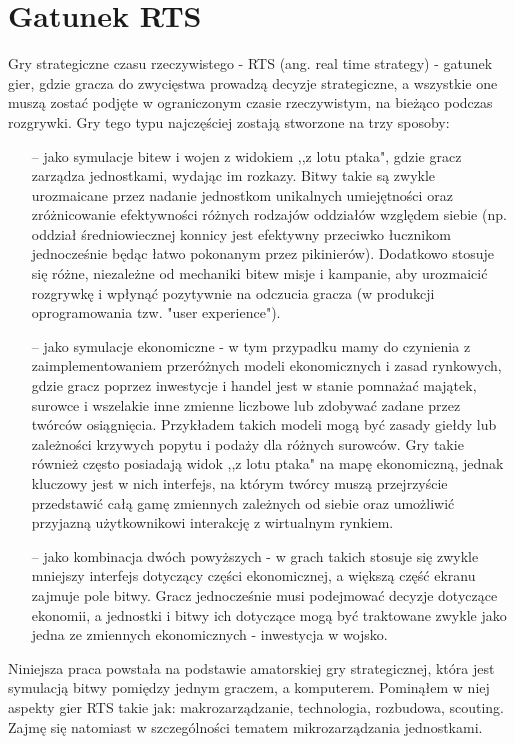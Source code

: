 \documentclass[12pt]{report}
\begin{document}
\section {Gatunek RTS}
Gry strategiczne czasu rzeczywistego - RTS (ang. real time strategy) - gatunek gier, gdzie gracza do zwycięstwa prowadzą decyzje strategiczne, a wszystkie one muszą zostać podjęte w ograniczonym czasie rzeczywistym, na bieżąco podczas rozgrywki. Gry tego typu najczęściej zostają stworzone na trzy sposoby: 
\begin{itemize}
\item[--] jako symulacje bitew i wojen z widokiem ,,z lotu ptaka", gdzie gracz zarządza jednostkami, wydając im rozkazy. Bitwy takie są zwykle urozmaicane przez nadanie jednostkom unikalnych umiejętności oraz zróżnicowanie efektywności różnych rodzajów oddziałów względem siebie (np. oddział średniowiecznej konnicy jest efektywny przeciwko łucznikom jednocześnie będąc łatwo pokonanym przez pikinierów). Dodatkowo stosuje się różne, niezależne od mechaniki bitew misje i kampanie, aby urozmaicić rozgrywkę i wpłynąć pozytywnie na odczucia gracza (w produkcji oprogramowania tzw. "user experience").
\item[--] jako symulacje ekonomiczne - w tym przypadku mamy do czynienia z zaimplementowaniem przeróżnych modeli ekonomicznych i zasad rynkowych, gdzie gracz poprzez inwestycje i handel jest w stanie pomnażać majątek, surowce i wszelakie inne zmienne liczbowe lub zdobywać zadane przez twórców osiągnięcia. Przykładem takich modeli mogą być zasady giełdy lub zależności krzywych popytu i podaży dla różnych surowców. Gry takie również często posiadają widok ,,z lotu ptaka" na mapę ekonomiczną, jednak kluczowy jest w nich interfejs, na którym twórcy muszą przejrzyście przedstawić całą gamę zmiennych zależnych od siebie oraz umożliwić przyjazną użytkownikowi interakcję z wirtualnym rynkiem.
\item[--] jako kombinacja dwóch powyższych - w grach takich stosuje się zwykle mniejszy interfejs dotyczący części ekonomicznej, a większą część ekranu zajmuje pole bitwy. Gracz jednocześnie musi podejmować decyzje dotyczące ekonomii, a jednostki i bitwy ich dotyczące mogą być traktowane zwykle jako jedna ze zmiennych ekonomicznych - inwestycja w wojsko.
\end{itemize} 
Niniejsza praca powstała na podstawie amatorskiej gry strategicznej, która jest symulacją bitwy pomiędzy jednym graczem, a komputerem. Pominąłem w niej aspekty gier RTS takie jak: makrozarządzanie, technologia, rozbudowa, scouting. Zajmę się natomiast w szczególności tematem mikrozarządzania jednostkami. 
\end{document}

